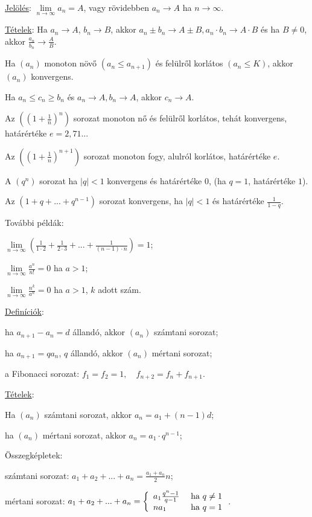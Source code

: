 \noindent\underline{Jelölés}: $\lim\limits_{n\to\infty} a_n=A$, vagy rövidebben $a_n\to A$ ha $n\to\infty$.

\noindent\underline{Tételek}: 
Ha $a_n\to A$, $b_n\to B$, akkor $a_n\pm b_n\to A\pm B, a_n\cdot b_n\to A\cdot B$ és ha $B\not=0$, akkor $\frac{a_n}{b_n}\to\frac{A}{B}$.


Ha $(a_n)$ monoton növő $(a_n\leq a_{n+1})$ és felülről korlátos $(a_n\leq K)$, akkor $(a_n)$ konvergens.

Ha $a_n\leq c_n\geq b_n$ és $a_n\to A, b_n\to A$, akkor $c_n\to A$.

Az $\left(\left(1+\frac{1}{n}\right)^n\right)$ sorozat monoton nő és felülről korlátos, tehát konvergens, határértéke $e=2{,}71...$

Az $\left(\left(1+\frac{1}{n}\right)^{n+1}\right)$ sorozat monoton fogy, alulról korlátos, határértéke $e$.

A $(q^n)$ sorozat ha $|q|<1$ konvergens és határértéke $0$, (ha $q=1$, határértéke $1$).

Az $(1+q+...+q^{n-1})$ sorozat konvergens, ha $|q|<1$ és határértéke $\frac{1}{1-q}$.

\noindent További példák:

$\lim\limits_{n\to\infty} \left(\frac{1}{1\cdot 2}+\frac{1}{2\cdot 3}+...+\frac{1}{(n-1)\cdot n}\right)=1$;

$\lim\limits_{n\to\infty} \frac{a^n}{n!}=0$ ha $a>1$;

$\lim\limits_{n\to\infty} \frac{n^k}{a^n}=0$ ha $a>1$, $k$ adott szám.

\noindent\underline{Definíciók}:

ha $a_{n+1}-a_n=d$ állandó, akkor $(a_n)$ számtani sorozat;

ha $a_{n+1}=qa_n$, $q$ állandó, akkor $(a_n)$ mértani sorozat;

a Fibonacci sorozat:
$f_1=f_2=1,\quad f_{n+2}=f_n+f_{n+1}$.

\noindent\underline{Tételek}:

Ha $(a_n)$ számtani sorozat, akkor $a_n=a_1+(n-1)d$;

ha $(a_n)$ mértani sorozat, akkor $a_n=a_1\cdot q^{n-1}$;

Összegképletek:

számtani sorozat: $a_1+a_2+...+a_n=\frac{a_1+a_n}{2}n$;

mértani sorozat: $a_1+a_2+...+a_n=
\left\{
\begin{array}{lr} 
a_1\frac{q^n-1}{q-1} &\text{~ha~} q\ne 1\cr 
na_1 &\text{~ha~} q=1
\end{array}
\right.$. 


